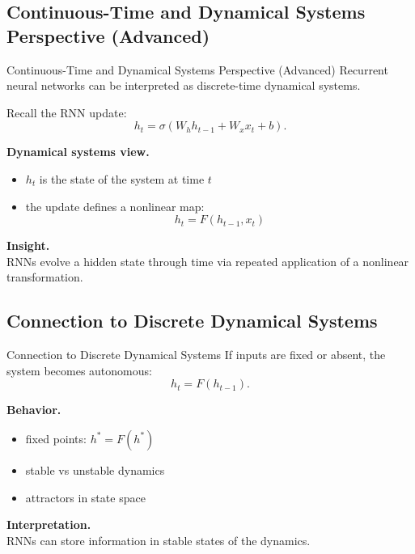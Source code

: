 \documentclass[aspectratio=169,11pt]{beamer}
\begin{document}
\subsection{Continuous-Time and Dynamical Systems Perspective (Advanced)}
\begin{frame}[t,allowframebreaks]{Continuous-Time and Dynamical Systems Perspective (Advanced)}
\small
Recurrent neural networks can be interpreted as discrete-time dynamical systems.

Recall the RNN update:
\[
h_t = \sigma(W_h h_{t-1} + W_x x_t + b).
\]

\textbf{Dynamical systems view.}\\ \begin{itemize}
    \item $h_t$ is the state of the system at time $t$
    \item the update defines a nonlinear map:
    \[
    h_t = F(h_{t-1}, x_t)
    \]
\end{itemize}

\textbf{Insight.}\\ RNNs evolve a hidden state through time via repeated application of a nonlinear transformation.
\end{frame}

\subsection{Connection to Discrete Dynamical Systems}
\begin{frame}[t,allowframebreaks]{Connection to Discrete Dynamical Systems}
\small
If inputs are fixed or absent, the system becomes autonomous:
\[
h_t = F(h_{t-1}).
\]

\textbf{Behavior.}\\ \begin{itemize}
    \item fixed points: $h^* = F(h^*)$
    \item stable vs unstable dynamics
    \item attractors in state space
\end{itemize}

\textbf{Interpretation.}\\ RNNs can store information in stable states of the dynamics.
\end{frame}
\end{document}
